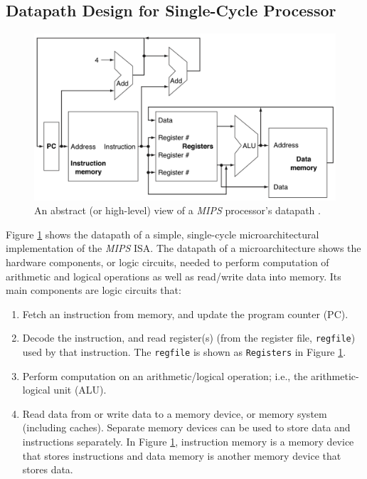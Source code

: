 \subsection{Datapath Design for Single-Cycle Processor}
\label{ssec:DatapathDesignforSingleCycleProcessors}


\begin{figure}[h]
\centering 
\includegraphics[width=6in]{./pics/mips-datapath}
\caption{An abstract (or high-level) view of a {\it MIPS} processor's datapath \cite{Patterson2005,Patterson2009}.}
\label{fig:mipsdatapath}
\end{figure}


Figure \ref{fig:mipsdatapath} shows the datapath of a simple, single-cycle microarchitectural implementation of the {\it MIPS} ISA. The datapath of a microarchitecture shows the hardware components, or logic circuits, needed to perform computation of arithmetic and logical operations as well as read/write data into memory. Its main components are logic circuits that: \vspace{-0.3cm}
\begin{enumerate} \itemsep -4pt
\item Fetch an instruction from memory, and update the program counter (PC).
\item Decode the instruction, and read register(s) (from the register file, {\tt regfile}) used by that instruction. The {\tt regfile} is shown as {\tt Registers} in Figure \ref{fig:mipsdatapath}.
\item Perform computation on an arithmetic/logical operation; i.e., the arithmetic-logical unit (ALU).
\item Read data from or write data to a memory device, or memory system (including caches). Separate memory devices can be used to store data and instructions separately. In Figure \ref{fig:mipsdatapath}, instruction memory is a memory device that stores instructions and data memory is another memory device that stores data. 
\end{enumerate}

